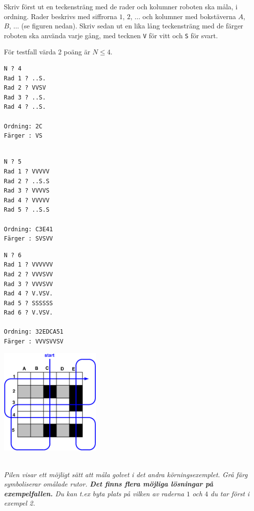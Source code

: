 Skriv först ut en teckensträng med de rader och kolumner roboten ska måla, i ordning.
Rader beskrivs med siffrorna $1$, $2$, $\dots$ och kolumner med bokstäverna $A$, $B$, $\dots$ (se figuren nedan). Skriv sedan ut en lika lång teckensträng med de färger roboten ska använda varje gång, med tecknen \texttt{V} för vitt och \texttt{S} för svart.

 För testfall värda 2 poäng är $N \le 4$.
\setlength\columnsep{20pt}
\begin{multicols}{3}

\begin{verbatim}
N ? 4
Rad 1 ? ..S.
Rad 2 ? VVSV
Rad 3 ? ..S.
Rad 4 ? ..S.

Ordning: 2C
Färger : VS


\end{verbatim}
\vfill
\columnbreak

\begin{verbatim}
N ? 5
Rad 1 ? VVVVV
Rad 2 ? ..S.S
Rad 3 ? VVVVS
Rad 4 ? VVVVV
Rad 5 ? ..S.S

Ordning: C3E41
Färger : SVSVV

\end{verbatim}
\vfill
\columnbreak

\begin{verbatim}
N ? 6
Rad 1 ? VVVVVV
Rad 2 ? VVVSVV
Rad 3 ? VVVSVV
Rad 4 ? V.VSV.
Rad 5 ? SSSSSS
Rad 6 ? V.VSV.

Ordning: 32EDCA51
Färger : VVVSVVSV
\end{verbatim}

\vfill
\end{multicols}
\begin{multicols}{2}
\begin{center}
  \includegraphics[width=5cm]{../skolkval/dentrottemalaren/problem_statement/golv.pdf}
\end{center}
\columnbreak
~\\ 
    \emph{Pilen visar ett möjligt sätt att måla golvet i det andra körningsexemplet. Grå färg symboliserar omålade rutor. \textbf{Det finns flera möjliga lösningar på exempel\-fallen.}
Du kan t.ex byta plats på vilken av raderna $1$ och $4$ du tar först i exempel 2.
    }
\vfill
\end{multicols}

